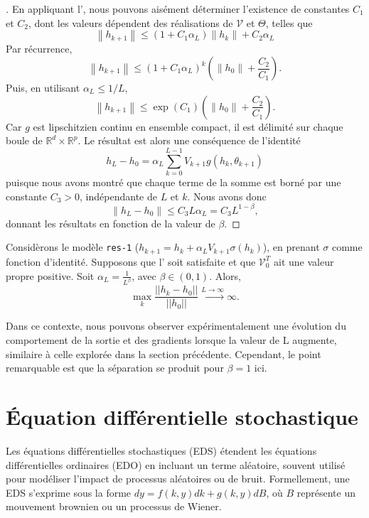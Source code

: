 \begin{proof}[]
En appliquant l', nous pouvons aisément déterminer l'existence de constantes $C_1$ et $C_2$, dont les valeurs dépendent des réalisations de $\mathscr{V}$ et $\Theta$, telles que
$$
    \left\|h_{k+1}\right\| \leqslant\left(1+C_1 \alpha_L\right)\left\|h_k\right\|+C_2 \alpha_L
$$
Par récurrence,
$$
    \left\|h_{k+1}\right\| \leqslant\left(1+C_1 \alpha_L\right)^k\left(\left\|h_0\right\|+\frac{C_2}{C_1}\right) .
$$
Puis, en utilisant $\alpha_L \leqslant 1 / L$,
$$
    \left\|h_{k+1}\right\| \leqslant \exp \left(C_1\right)\left(\left\|h_0\right\|+\frac{C_2}{C_1}\right) .
$$
Car $g$ est lipschitzien continu en ensemble compact, il est délimité sur chaque boule de $\mathbb{R}^d \times \mathbb{R}^p$. Le résultat est alors une conséquence de l'identité
$$
    h_L-h_0=\alpha_L \sum_{k=0}^{L-1} V_{k+1} g\left(h_k, \theta_{k+1}\right)
$$
puisque nous avons montré que chaque terme de la somme est borné par une constante $C_3>0$, indépendante de $L$ et $k$. Nous avons donc 
$$
    \left\|h_L-h_0\right\| \leqslant C_3 L \alpha_L=C_3 L^{1-\beta},
$$
donnant les résultats en fonction de la valeur de $\beta$.
\end{proof}

\begin{proposition}\label{prop13}
    Considèrons le modèle \texttt{res-1} ($h_{k+1} = h_k +\alpha_{L}V_{k+1}\sigma(h_k) $), en prenant $\sigma$ comme fonction d'identité. Supposons que l' soit satisfaite et que $\mathcal{V} _0 ^T$ ait une valeur propre positive. Soit $\alpha_L = \frac{1}{L^{\beta}}$, avec $\beta \in (0,1)$. Alors, 
    \[
        \max_{k}\frac{||h_k-h_0||}{||h_0||} \xrightarrow{L \to \infty } \infty
    .\]
\end{proposition}

Dans ce contexte, nous pouvons observer expérimentalement une évolution du comportement de la sortie et des gradients lorsque la valeur de L augmente, similaire à celle explorée dans la section précédente. Cependant, le point remarquable est que la séparation se produit pour $\beta = 1$ ici.

\section{Équation différentielle stochastique}
Les équations différentielles stochastiques (EDS) étendent les équations différentielles ordinaires (EDO) en incluant un terme aléatoire, souvent utilisé pour modéliser l'impact de processus aléatoires ou de bruit. Formellement, une EDS s'exprime sous la forme $dy = f(k,y)dk + g(k,y)dB$, où $B$ représente un mouvement brownien ou un processus de Wiener.


